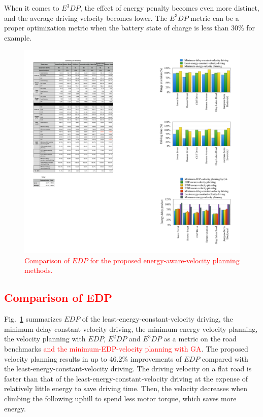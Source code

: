 \documentclass{IEEEtran}
\begin{document}
When it comes to $E^3DP$, the effect of energy penalty becomes even more distinct, and the average driving velocity becomes lower. 
The $E^3DP$ metric can be a proper optimization metric when the battery state of charge is less than 30\% for example.

\begin{figure}	 %
\centering
\includegraphics[width=\hsize]{Figures/EDP_comp_bar.pdf}
\caption{\textcolor{red}{Comparison of $EDP$ for the proposed energy-aware-velocity planning methods.}}
\label{fig:EDP_bar}
\end{figure} 

\textcolor{red}{\subsection{Comparison of EDP}}

Fig.~\ref{fig:EDP_bar} summarizes $EDP$ of the least-energy-constant-velocity driving, the minimum-delay-constant-velocity driving, the minimum-energy-velocity planning, the velocity planning with $EDP$, $E^2DP$ and $E^3DP$ as a metric on the road benchmarks \textcolor{red}{and the minimum-EDP-velocity planning with GA}. The proposed velocity planning results in up to 46.2\% improvements of $EDP$ compared with the least-energy-constant-velocity driving. 
The driving velocity on a flat road is faster than that of the least-energy-constant-velocity driving at the expense of relatively little energy to save driving time. Then, the velocity decreases when climbing the following uphill to spend less motor torque, which saves more energy.
\end{document}
